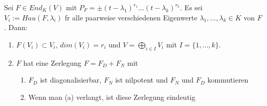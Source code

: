 \documentclass[8pt, a4paper, twocolumn, landscape]{article}
\newcommand{\comment}[1]{}
\begin{document}
\begin{theorem}  
Sei $F \in End_K(V)$ mit $P_F = \pm (t- \lambda_1)^{r_1}... (t- \lambda_k)^{r_k}$. Es sei $V_i := Hau(F, \lambda_i)$ f\uee r alle paarweise verschiedenen Eigenwerte $\lambda_1, ... , \lambda_k \in K$ von $F$. Dann:
\begin{enumerate}
\item $F(V_i) \subset V_i$, $dim(V_i) = r_i$ und $V =\bigoplus\limits_{i \in I} V_i$ mit $I= \{1, ..., k\}$.
\item $F$ hat eine Zerlegung $F = F_D + F_N$ mit
\begin{enumerate}
\item $F_D$ ist diagonalisierbar, $F_N$ ist nilpotent und $F_N$ und $F_D$ kommutieren
\item Wenn man (a) verlangt, ist diese Zerlegung eindeutig
\end{enumerate}
\end{enumerate}
\end{theorem}

\comment{
\begin{corollary}
Sei $A \in M(n \times n; K)$, so dass $P_A$ in Linearfaktoren zerf\aee llt. Dann $\exists S \in GL(n)$: 
$$
S A S^{-1}=\left(\begin{array}{cccc}{} & {} & {} & {} 
\\ {\lambda_{1} E_{r_{1}}+N_{1}} & {} & {} & {0} 
\\ {} & {} & {\ddots} & {} 
\\ {0} & {} & {} & {\lambda_{1} E_{r_{1}}+N_{1}} 
\end{array}\right)
$$
wobei f\uee r $i = 1, ... k$
\\ \centerline{$
\lambda_{1} E_{r_{1}}+N_{1} = 
\left(\begin{array}{ccc}
{\lambda_{i}} & {} & {*} 
\\ {} & {\ddots} & {} 
\\ {0} & {} & {\lambda_{i}}\end{array}\right) \in M(r_i \times r_i; K)$.}
mit nilpotenten $N_i$. Insbesondere ist $\tilde{A} = D + N$, wobei $D$ eine Diagonalmatrix und $N$ nilpotent ist und $N$ und $D$ kommutieren.
\end{corollary}
}
\end{document}
